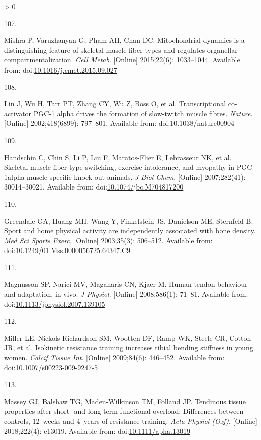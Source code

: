 \documentclass[twoside,10pt]{gihclass} %
\newlength{\cslhangindent}
\newlength{\csllabelwidth}
\newenvironment{CSLReferences}[3] %
 {%
  \setlength{\parindent}{0pt}
  \ifodd #1 \everypar{\setlength{\hangindent}{\cslhangindent}}\ignorespaces\fi
  \ifnum #2 > 0
  \setlength{\parskip}{#2\baselineskip}
  \fi
 }%
 {}
\newcommand{\CSLLeftMargin}[1]{\parbox[t]{\maxof{\widthof{#1}}{\csllabelwidth}}{#1}}
\newcommand{\CSLRightInline}[1]{\parbox[t]{\linewidth}{#1}}
\begin{document}
\begin{CSLReferences}{0}{0}
\leavevmode\hypertarget{ref-RN2816}{}%
\CSLLeftMargin{107. }
\CSLRightInline{Mishra P, Varuzhanyan G, Pham AH, Chan DC. Mitochondrial dynamics is a distinguishing feature of skeletal muscle fiber types and regulates organellar compartmentalization. \emph{Cell Metab}. {[}Online{]} 2015;22(6): 1033--1044. Available from: doi:\href{https://doi.org/10.1016/j.cmet.2015.09.027}{10.1016/j.cmet.2015.09.027}}

\leavevmode\hypertarget{ref-RN2818}{}%
\CSLLeftMargin{108. }
\CSLRightInline{Lin J, Wu H, Tarr PT, Zhang CY, Wu Z, Boss O, et al. Transcriptional co-activator PGC-1 alpha drives the formation of slow-twitch muscle fibres. \emph{Nature}. {[}Online{]} 2002;418(6899): 797--801. Available from: doi:\href{https://doi.org/10.1038/nature00904}{10.1038/nature00904}}

\leavevmode\hypertarget{ref-RN2819}{}%
\CSLLeftMargin{109. }
\CSLRightInline{Handschin C, Chin S, Li P, Liu F, Maratos-Flier E, Lebrasseur NK, et al. Skeletal muscle fiber-type switching, exercise intolerance, and myopathy in PGC-1alpha muscle-specific knock-out animals. \emph{J Biol Chem}. {[}Online{]} 2007;282(41): 30014--30021. Available from: doi:\href{https://doi.org/10.1074/jbc.M704817200}{10.1074/jbc.M704817200}}

\leavevmode\hypertarget{ref-RN2775}{}%
\CSLLeftMargin{110. }
\CSLRightInline{Greendale GA, Huang MH, Wang Y, Finkelstein JS, Danielson ME, Sternfeld B. Sport and home physical activity are independently associated with bone density. \emph{Med Sci Sports Exerc}. {[}Online{]} 2003;35(3): 506--512. Available from: doi:\href{https://doi.org/10.1249/01.Mss.0000056725.64347.C9}{10.1249/01.Mss.0000056725.64347.C9}}

\leavevmode\hypertarget{ref-RN2771}{}%
\CSLLeftMargin{111. }
\CSLRightInline{Magnusson SP, Narici MV, Maganaris CN, Kjaer M. Human tendon behaviour and adaptation, in vivo. \emph{J Physiol}. {[}Online{]} 2008;586(1): 71--81. Available from: doi:\href{https://doi.org/10.1113/jphysiol.2007.139105}{10.1113/jphysiol.2007.139105}}

\leavevmode\hypertarget{ref-RN2774}{}%
\CSLLeftMargin{112. }
\CSLRightInline{Miller LE, Nickols-Richardson SM, Wootten DF, Ramp WK, Steele CR, Cotton JR, et al. Isokinetic resistance training increases tibial bending stiffness in young women. \emph{Calcif Tissue Int}. {[}Online{]} 2009;84(6): 446--452. Available from: doi:\href{https://doi.org/10.1007/s00223-009-9247-5}{10.1007/s00223-009-9247-5}}

\leavevmode\hypertarget{ref-RN2772}{}%
\CSLLeftMargin{113. }
\CSLRightInline{Massey GJ, Balshaw TG, Maden-Wilkinson TM, Folland JP. Tendinous tissue properties after short- and long-term functional overload: Differences between controls, 12~weeks and 4~years of resistance training. \emph{Acta Physiol (Oxf)}. {[}Online{]} 2018;222(4): e13019. Available from: doi:\href{https://doi.org/10.1111/apha.13019}{10.1111/apha.13019}}


\end{CSLReferences}
\end{document}
